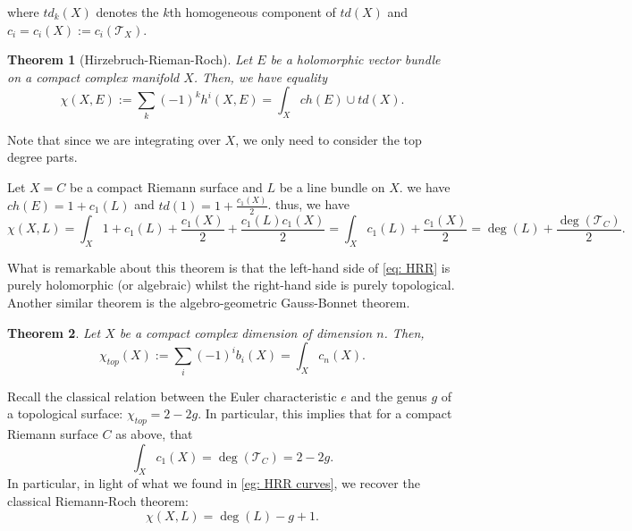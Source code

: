 \documentclass[11pt]{amsart}
\newcommand{\cT}{\mathcal{T}}
\newtheorem{theorem}{Theorem}[subsection]
\theoremstyle{definition}
\numberwithin{equation}{section}
\begin{document}
where $td_k(X)$ denotes the $k$th homogeneous component of $td(X)$ and $c_i=c_i(X):=c_i(\cT_X)$.
\begin{theorem}[Hirzebruch-Rieman-Roch]
	Let $E$ be a holomorphic vector bundle on a compact complex manifold $X$. Then, we have equality
	\begin{equation}
	\chi(X,E):=\sum_k(-1)^k h^i(X,E)=\int_X ch(E)\cup td(X).\label{eq: HRR}
	\end{equation}
\end{theorem}
Note that since we are integrating over $X$, we only need to consider the top degree parts.
\begin{example}\label{eg: HRR curves}
	Let $X=C$ be a compact Riemann surface and $L$ be a line bundle on $X$. we have $ch(E)=1+c_1(L)$ and $td(1)=1+\frac{c_1(X)}{2}$. thus, we have
	\[
	\chi(X,L)=\int_X 1+c_1(L)+\frac{c_1(X)}{2}+\frac{c_1(L)c_1(X)}{2}=\int_X c_1(L)+\frac{c_1(X)}{2}=\deg(L)+\frac{\deg(\cT_C)}{2}.
	\]
\end{example}
What is remarkable about this theorem is that the left-hand side of \eqref{eq: HRR} is purely holomorphic (or algebraic) whilst the right-hand side is purely topological. Another similar theorem is the algebro-geometric Gauss-Bonnet theorem.
\begin{theorem}
	Let $X$ be a compact complex dimension of dimension $n$. Then, 
	\[
	\chi_{top}(X):=\sum_i(-1)^i b_i(X)=\int_Xc_n(X).
	\]
\end{theorem}

Recall the classical relation between the Euler characteristic $e$ and the genus $g$ of a topological surface: $\chi_{top}=2-2g$. In particular, this implies that for a compact Riemann surface $C$ as above, that
 \[
	\int_Xc_1(X)=\deg(\cT_C)=2-2g.
	\]
In particular, in light of what we found in \autoref{eg: HRR curves}, we recover the classical Riemann-Roch theorem:
\[
\chi(X,L)=\deg(L)-g+1.
\]
\end{document}
